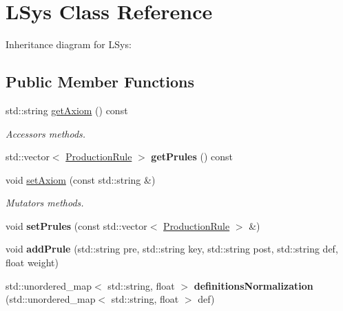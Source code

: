 \hypertarget{class_l_sys}{}\section{L\+Sys Class Reference}
\label{class_l_sys}


Inheritance diagram for L\+Sys\+:
\subsection*{Public Member Functions}
\begin{DoxyCompactItemize}
\item 
\mbox{\label{class_l_sys_aba12f0e5f186bc7db9ec4a6006d9cc37}} 
std\+::string \hyperlink{class_l_sys_aba12f0e5f186bc7db9ec4a6006d9cc37}{get\+Axiom} () const
\begin{DoxyCompactList}\small\item\em Accessors methods. \end{DoxyCompactList}\item 
\mbox{\label{class_l_sys_a62c17b62882891989d704cecefb8c4d9}} 
std\+::vector$<$ \hyperlink{struct_production_rule}{Production\+Rule} $>$ {\bfseries get\+Prules} () const
\item 
\mbox{\label{class_l_sys_a1983f18c67516162ede5a8de4015adfe}} 
void \hyperlink{class_l_sys_a1983f18c67516162ede5a8de4015adfe}{set\+Axiom} (const std\+::string \&)
\begin{DoxyCompactList}\small\item\em Mutators methods. \end{DoxyCompactList}\item 
\mbox{\label{class_l_sys_a4d01a459e63b0885c2b731360d189f49}} 
void {\bfseries set\+Prules} (const std\+::vector$<$ \hyperlink{struct_production_rule}{Production\+Rule} $>$ \&)
\item 
\mbox{\label{class_l_sys_a3a3f29320097227580b5f6ccbe68d839}} 
void {\bfseries add\+Prule} (std\+::string pre, std\+::string key, std\+::string post, std\+::string def, float weight)
\item 
\mbox{\label{class_l_sys_a3ad596419325259a7d83bf0da45573e8}} 
std\+::unordered\+\_\+map$<$ std\+::string, float $>$ {\bfseries definitions\+Normalization} (std\+::unordered\+\_\+map$<$ std\+::string, float $>$ def)

\end{DoxyCompactItemize}
